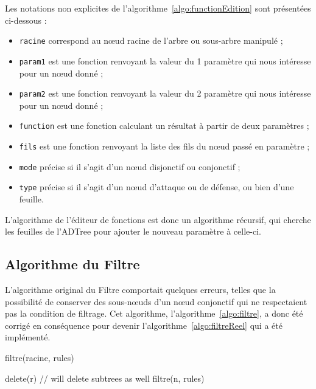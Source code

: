  Les notations non explicites de l'{\sc algorithme}~\ref{algo:functionEdition} sont présentées ci-dessous :
        \begin{itemize}
            \item \verb|racine| correspond au nœud racine de l'arbre ou sous-arbre manipulé ;
            \item \verb|param1| est une fonction renvoyant la valeur du 1\ier{} paramètre qui nous intéresse pour un nœud donné ;
            \item \verb|param2| est une fonction renvoyant la valeur du 2\ieme{} paramètre qui nous intéresse pour un nœud donné ;
            \item \verb|function| est une fonction calculant un résultat à partir de deux paramètres ;
            \item \verb|fils| est une fonction renvoyant la liste des fils du nœud passé en paramètre ;
            \item \verb|mode| précise si il s'agit d'un nœud disjonctif ou conjonctif ;
            \item \verb|type| précise si il s'agit d'un nœud d'attaque ou de défense, ou bien d'une feuille.
        \end{itemize}

    L'algorithme de l'éditeur de fonctions est donc un algorithme récursif, qui cherche les feuilles de l'ADTree pour ajouter le nouveau paramètre à celle-ci. 

\subsection{Algorithme du Filtre}
\label{ssec:implemFiltre}

L'algorithme original du Filtre  comportait quelques erreurs, telles que la possibilité de conserver des sous-n\oe{}uds d'un n\oe{}ud conjonctif qui ne respectaient pas la condition de filtrage. Cet algorithme, 
l'{\sc algorithme}~\ref{algo:filtre}, a donc été corrigé en conséquence pour devenir l'{\sc algorithme}~\ref{algo:filtreReel} qui a été implémenté.

 	\begin{algorithm}[H]
            \caption{filtre(racine, rules)}
            \label{algo:filtre}
            \begin{algorithmic}
                        \STATE delete(r) // will delete subtrees as well
                        \RETURN
                    \ENDIF
                \ENDFOR
                \STATE
                    \STATE filtre(n, rules)
                \ENDFOR
            \end{algorithmic}
        \end{algorithm}
        

